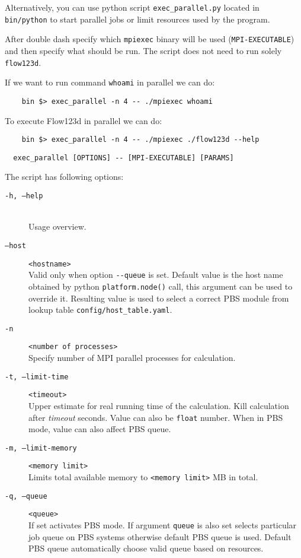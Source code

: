 \documentclass[12pt,a4paper]{report}
\begin{document}
Alternatively, you can use python script \verb'exec_parallel.py' located in \verb'bin/python' to start parallel jobs or limit resources used by the program.

After double dash specify which \verb'mpiexec' binary will be used (\verb'MPI-EXECUTABLE') and then specify what should be run. 
The script does not need to run solely \verb'flow123d'.

If we want to run command \verb'whoami' in parallel we can do:
\begin{verbatim}
	bin $> exec_parallel -n 4 -- ./mpiexec whoami
\end{verbatim}

To execute Flow123d in parallel we can do:
\begin{verbatim}
	bin $> exec_parallel -n 4 -- ./mpiexec ./flow123d --help
\end{verbatim}


\begin{verbatim}
  exec_parallel [OPTIONS] -- [MPI-EXECUTABLE] [PARAMS]
\end{verbatim}

The script has following options:

\begin{description}
  \item[{\tt -h, --help}] \hfill\\
  	Usage overview.
  \item[{\tt --host}] \verb'<hostname>' \hfill\\
  		Valid only when option \verb'--queue' is set.
        Default value is the host name obtained by python \verb'platform.node()' call, this argument can be used to override it. 
        Resulting value is used to select a correct PBS module from lookup table \verb'config/host_table.yaml'.
  \item[{\tt -n}] \verb'<number of processes>' \hfill\\
  	Specify number of MPI parallel processes for calculation.
  \item[{\tt -t, --limit-time}] \verb'<timeout>' \hfill\\
  	Upper estimate for real running time of the calculation. Kill calculation after {\it timeout} seconds. 
  	Value can also be \verb'float' number. When in PBS mode, value can also affect PBS queue. 
  \item[{\tt -m, --limit-memory}] \verb'<memory limit>' \hfill\\
  	Limits total available memory to \verb'<memory limit>' MB in total.
  \item[{\tt -q, --queue}] \verb'<queue>' \hfill\\
  		If set activates PBS mode. If argument \verb'queue' is also set selects particular job queue
  		on PBS systems otherwise default PBS queue is used. Default PBS queue automatically
  		choose valid queue based on resources.
\end{description}
\end{document}
